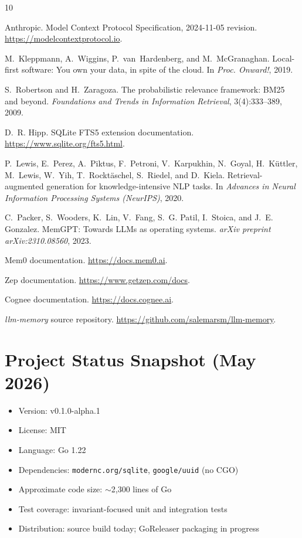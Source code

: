 \documentclass[11pt,a4paper]{article}
\begin{document}
\begin{thebibliography}{10}

Anthropic.
\newblock Model Context Protocol Specification, 2024-11-05 revision.
\newblock \url{https://modelcontextprotocol.io}.

M.~Kleppmann, A.~Wiggins, P.~van~Hardenberg, and M.~McGranaghan.
\newblock Local-first software: You own your data, in spite of the cloud.
\newblock In \emph{Proc. Onward!}, 2019.

S.~Robertson and H.~Zaragoza.
\newblock The probabilistic relevance framework: BM25 and beyond.
\newblock \emph{Foundations and Trends in Information Retrieval}, 3(4):333--389, 2009.

D.~R. Hipp.
\newblock SQLite FTS5 extension documentation.
\newblock \url{https://www.sqlite.org/fts5.html}.

P.~Lewis, E.~Perez, A.~Piktus, F.~Petroni, V.~Karpukhin, N.~Goyal, H.~K{\"u}ttler, M.~Lewis, W.~Yih, T.~Rockt{\"a}schel, S.~Riedel, and D.~Kiela.
\newblock Retrieval-augmented generation for knowledge-intensive NLP tasks.
\newblock In \emph{Advances in Neural Information Processing Systems (NeurIPS)}, 2020.

C.~Packer, S.~Wooders, K.~Lin, V.~Fang, S.~G. Patil, I.~Stoica, and J.~E. Gonzalez.
\newblock MemGPT: Towards LLMs as operating systems.
\newblock \emph{arXiv preprint arXiv:2310.08560}, 2023.

Mem0 documentation.
\newblock \url{https://docs.mem0.ai}.

Zep documentation.
\newblock \url{https://www.getzep.com/docs}.

Cognee documentation.
\newblock \url{https://docs.cognee.ai}.

\textit{llm-memory} source repository.
\newblock \url{https://github.com/salemarsm/llm-memory}.

\end{thebibliography}

\appendix
\section{Project Status Snapshot (May 2026)}

\begin{itemize}
 \item Version: v0.1.0-alpha.1
 \item License: MIT
 \item Language: Go 1.22
 \item Dependencies: \texttt{modernc.org/sqlite}, \texttt{google/uuid} (no CGO)
 \item Approximate code size: $\sim$2{,}300 lines of Go
 \item Test coverage: invariant-focused unit and integration tests
 \item Distribution: source build today; GoReleaser packaging in progress
\end{itemize}
\end{document}
